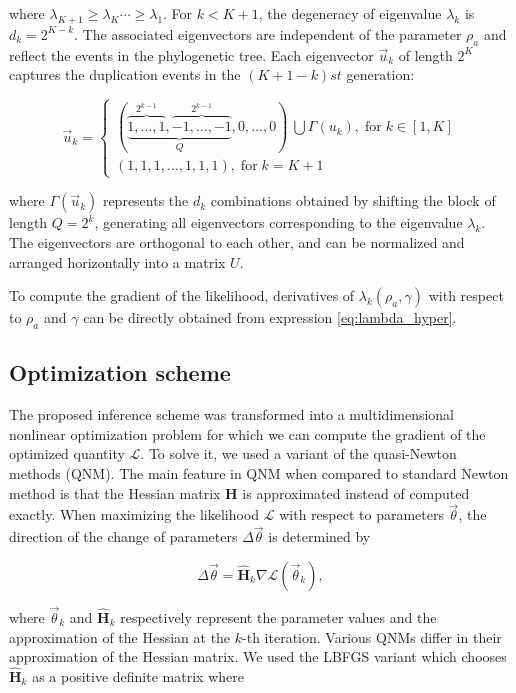 \documentclass[preprint,amsmath,amssymb,superscriptaddress,showpacs,pre]{revtex4-1}
\begin{document}
where $\lambda_{K+1}\ge\lambda_{K}\cdots\ge\lambda_{1}$. 
For $k<K+1$, the degeneracy of eigenvalue $\lambda_k$ is $d_k=2^{K-k}$.  
The associated eigenvectors are independent of the parameter $\rho_a$ and reflect the events in the phylogenetic tree.
Each eigenvector $\vec{u}_k$ of length $2^K$ captures the duplication events in the $(K+1 -k) st$ generation:

\begin{equation} 
\nonumber
 \vec{u}_k =
\begin{cases}
{(\underbrace{\overbrace{1,\ldots,1}^{2^{k-1}},\overbrace{-1,\ldots,-1}^{2^{k-1}}}_Q,0,\ldots,0)\ \bigcup \Gamma(u_k) }, \;\text{for}\; k\in[1,K] \\
(1,1,1,\ldots,1,1,1), \;\text{for}\; k=K+1
\label{eq:eigenvec_simpler_case}
\end{cases}	
\end{equation}

where $\Gamma(\vec{u}_k )$ represents the $d_k$ combinations obtained by shifting the block of length $Q=2^k$, generating all eigenvectors corresponding to the eigenvalue $\lambda_k$.  
The eigenvectors are orthogonal to each other, and can be  normalized and arranged horizontally into a matrix $U$. 

To compute the gradient of the likelihood, derivatives of $\lambda_k(\rho_a,\gamma)$ with respect to $\rho_a$ and $\gamma$ can be directly obtained from expression \eqref{eq:lambda_hyper}.


\subsection{Optimization scheme}
\label{sub:optimization_scheme}

The proposed inference scheme was transformed into a multidimensional nonlinear optimization problem for which we can compute the gradient of the optimized quantity $\mathcal{L}$.
To solve it, we used a variant of the quasi-Newton methods (QNM).  
The main feature in QNM when compared to standard Newton method is that the Hessian matrix $\bm H$ is approximated instead of computed exactly. 
When maximizing the likelihood $\mathcal{L}$ with respect to parameters $\vec{\theta}$, the direction of the change of parameters $\Delta\vec{\theta}$ is determined by

$$ \Delta\vec{\theta} = \mathbf{\hat{H}}_k \nabla \mathcal{L}(\vec{\theta}_k), $$

where $\vec{\theta}_k$ and $\mathbf{\hat{H}}_k$ respectively represent the parameter values and the approximation of the Hessian at the $k$-th iteration. 
Various QNMs differ in their approximation of the Hessian matrix.
We used the LBFGS variant which chooses $\mathbf{\hat{H}}_k$ as a positive definite matrix where
\end{document}
